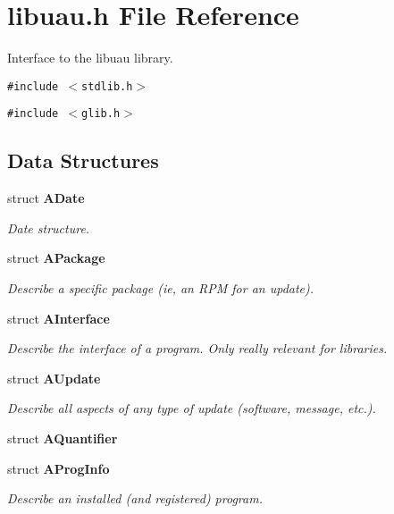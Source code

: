 \section{libuau.h File Reference}
\label{libuau_8h}
Interface to the libuau library.  


{\tt \#include $<$stdlib.h$>$}\par
{\tt \#include $<$glib.h$>$}\par
\subsection*{Data Structures}
\begin{CompactItemize}
\item 
struct {\bf ADate}
\begin{CompactList}\small\item\em Date structure. \item\end{CompactList}\item 
struct {\bf APackage}
\begin{CompactList}\small\item\em Describe a specific package (ie, an RPM for an update). \item\end{CompactList}\item 
struct {\bf AInterface}
\begin{CompactList}\small\item\em Describe the interface of a program. Only really relevant for libraries. \item\end{CompactList}\item 
struct {\bf AUpdate}
\begin{CompactList}\small\item\em Describe all aspects of any type of update (software, message, etc.). \item\end{CompactList}\item 
struct {\bf AQuantifier}
\item 
struct {\bf AProg\-Info}
\begin{CompactList}\small\item\em Describe an installed (and registered) program. \item\end{CompactList}\end{CompactItemize}
